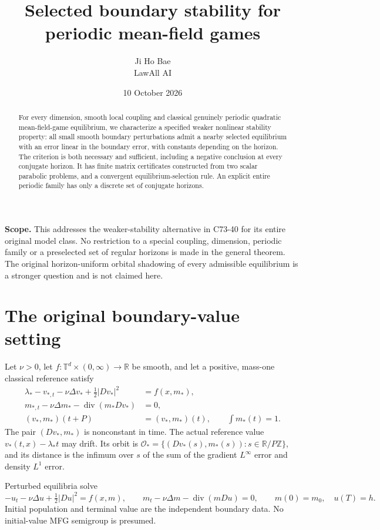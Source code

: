 \documentclass[11pt,a4paper]{article}
\title{Selected boundary stability for periodic mean-field games}
\author{Ji Ho Bae\\\small LawAll AI}
\date{10 October 2026}
\begin{document}
\maketitle
\begin{abstract}
For every dimension, smooth local coupling and classical genuinely
periodic quadratic mean-field-game equilibrium, we characterize a
specified weaker nonlinear stability property: all small smooth
boundary perturbations admit a nearby selected equilibrium with an
error linear in the boundary error, with constants depending on the
horizon. The criterion is both necessary and sufficient, including a
negative conclusion at every conjugate horizon. It has finite matrix
certificates constructed from two scalar parabolic problems, and a
convergent equilibrium-selection rule. An explicit entire periodic
family has only a discrete set of conjugate horizons.
\end{abstract}

\textbf{Scope.} This addresses the weaker-stability
alternative in C73-40 for its entire original model class.
No restriction to a special coupling,
dimension, periodic family or a preselected set of regular horizons is
made in the general theorem. The original horizon-uniform orbital
shadowing of every admissible equilibrium is a stronger question and
is not claimed here.

\section{The original boundary-value setting}
Let $\nu>0$, let $f:\mathbb T^d\times(0,\infty)\to\mathbb R$ be
smooth, and let a positive, mass-one classical reference satisfy
\begin{equation}\tag{MFG}\label{MFG}
 \begin{split}
 \lambda_*-v_{*,t}-\nu\Delta v_*+\tfrac12|Dv_*|^2&=f(x,m_*),\\
 m_{*,t}-\nu\Delta m_*-\operatorname{div}(m_*Dv_*)&=0,\\
 (v_*,m_*)(t+P)&=(v_*,m_*)(t),\qquad \int m_*(t)=1.
 \end{split}
\end{equation}
The pair $(Dv_*,m_*)$ is nonconstant in time. The actual reference
value $v_*(t,x)-\lambda_*t$ may drift. Its orbit is
$\mathcal O_* =\{(Dv_*(s),m_*(s)):s\in\mathbb R/P\mathbb Z\}$,
and its distance is the infimum over $s$ of the sum of the gradient
$L^\infty$ error and density $L^1$ error.

Perturbed equilibria solve
\[
 -u_t-\nu\Delta u+\tfrac12|Du|^2=f(x,m),\qquad
 m_t-\nu\Delta m-\operatorname{div}(mDu)=0,
 \qquad m(0)=m_0,\quad u(T)=h.
\]
Initial population and terminal value are the independent boundary
data. No initial-value MFG semigroup is presumed.
\end{document}
